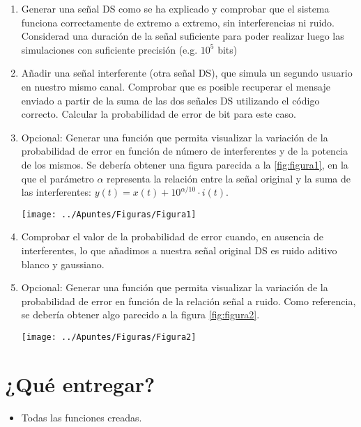 \documentclass[es,practica]{uah}
\begin{document}
\begin{enumerate}
	\item Generar una señal DS como se ha explicado y comprobar que el sistema funciona correctamente de extremo a extremo, sin interferencias ni ruido. Considerad una duración de la señal suficiente para poder realizar luego las simulaciones con suficiente precisión (e.g. $10^5$ bits)
	\item Añadir una señal interferente (otra señal DS), que simula un segundo usuario en nuestro mismo canal. Comprobar que es posible recuperar el mensaje enviado a partir de la suma de las dos señales DS utilizando el código correcto. Calcular la probabilidad de error de bit para este caso. 
	\item Opcional: Generar una función que permita visualizar la variación de la probabilidad de error en función de número de interferentes y de la potencia de los mismos. Se debería obtener una figura parecida a la \ref{fig:figura1}, en la que el parámetro $\alpha$ representa la relación entre la señal original y la suma de las interferentes: $y(t) = x(t) + 10^{\alpha/10}\cdot i(t)$.
	

	\begin{figure*}[h!]
		\centering\texttt{[image: ../Apuntes/Figuras/Figura1]}
		\caption{Salida de ejemplo para el apartado 3}
		\label{fig:figura1}
	\end{figure*}


	\item Comprobar el valor de la probabilidad de error cuando, en ausencia de interferentes, lo que añadimos a nuestra señal original DS es ruido aditivo blanco y gaussiano.
	\item Opcional: Generar una función que permita visualizar la variación de la probabilidad de error en función de la relación señal a ruido. Como referencia, se debería obtener algo parecido a la figura \ref{fig:figura2}.
	
	\begin{figure*}[h!]
		\centering\texttt{[image: ../Apuntes/Figuras/Figura2]}
		\caption{Salida de ejemplo para el apartado 5}
		\label{fig:figura2}
	\end{figure*}

\end{enumerate}


\section{¿Qué entregar?}
\begin{itemize}
	\item Todas las funciones creadas.
\end{itemize}


\end{document}
